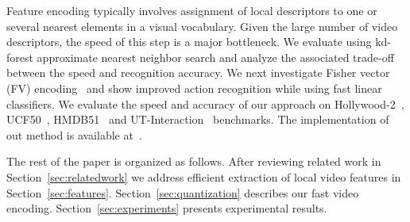 Feature encoding typically involves assignment of local
descriptors to one or several nearest elements in a visual
vocabulary. Given the large number of video descriptors, the
speed of this step is a major bottleneck. We evaluate using
kd-forest approximate nearest neighbor search \cite{Philbin07}
and analyze the associated trade-off between the speed and
recognition accuracy. We next investigate Fisher vector (FV)
encoding~\cite{Perronnin12} and show improved action recognition while using fast linear classifiers.
We evaluate the speed and accuracy of our approach on
\mbox{Hollywood-2}~\cite{Marszalek09}, UCF50~\cite{Reddy12},
HMDB51~\cite{Kuehne11} and UT-Interaction~\cite{Ryoo10}
benchmarks. The implementation of out method is available at~\cite{projectpage}.

The rest of the paper is organized as follows. 
After reviewing related work in Section~\ref{sec:relatedwork} we address efficient extraction of local video features in
Section~\ref{sec:features}. Section~\ref{sec:quantization}
describes our fast video encoding.
Section~\ref{sec:experiments} presents experimental results.
